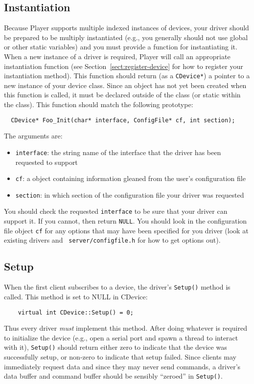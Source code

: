 \documentclass[11pt]{report}
\begin{document}
\subsection{Instantiation}
\label{sect:instantiation}
Because Player supports multiple indexed instances of devices, your driver
should be prepared to be multiply instantiated (e.g., you generally
should not use global or other static variables) and you must provide
a function for instantiating it.  When a new instance of a driver is
required, Player will call an appropriate instantiation function (see
Section~\ref{sect:register-device} for how to register your instantiation
method).  This function should return (as a {\tt CDevice*}) a pointer to a
new instance of your device class.  Since an object has not yet been created
when this function is called, it must be declared outside of the class
(or static within the class).
This function should match the following prototype:
\begin{verbatim}
  CDevice* Foo_Init(char* interface, ConfigFile* cf, int section);
\end{verbatim}
The arguments are:
\begin{itemize}
\item {\tt interface}: the string name of the interface that the driver has
been requested to support
\item {\tt cf}: a object containing information gleaned from the user's
configuration file
\item {\tt section}: in which section of the configuration file your driver 
was requested
\end{itemize}
You should check the requested {\tt interface} to be sure that your driver can
support it.  If you cannot, then return {\tt NULL}.  You should look in
the configuration file object {\tt cf} for any options that may have been
specified for you driver (look at existing drivers and {\tt
server/configfile.h} for how to get options out).

\subsection{Setup}
When the first client subscribes to a device, the driver's {\tt Setup()}
method is called.  This method is set to NULL in CDevice:
\begin{verbatim}
    virtual int CDevice::Setup() = 0;
\end{verbatim}
Thus every driver {\em must} implement this method.  After doing whatever is
required to initialize the device (e.g., open a serial port and spawn a thread
to interact with it), {\tt Setup()} should return either zero to indicate that
the device was successfully setup, or non-zero to indicate that setup failed.
Since clients may immediately request data and since they may never send 
commands, a driver's data buffer and command buffer should be sensibly
``zeroed'' in {\tt Setup()}.
\end{document}
